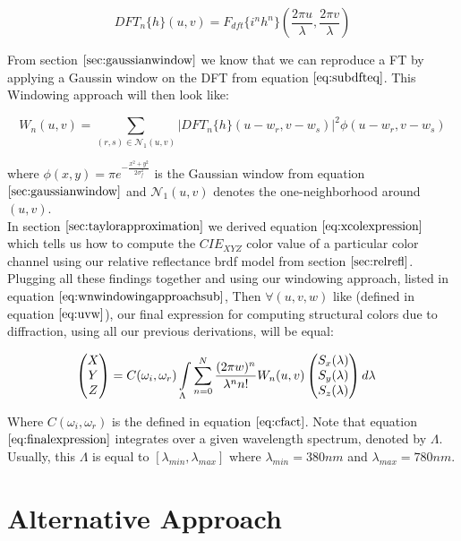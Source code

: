 \begin{equation}
DFT_{n}\{h\}(u,v) = {F}_{dft}\{i^n h^n\}(\frac{2\pi u}{\lambda},\frac{2\pi v}{\lambda})
\label{eq:subdfteq}
\end{equation}

From section $\ref{sec:gaussianwindow}$ we know that we can reproduce a FT by applying a Gaussin window on the DFT from equation $\ref{eq:subdfteq}$. This Windowing approach will then look like: 

\begin{equation}
  W_{n}(u,v) = \sum_{(r,s) \in \mathcal{N}_1(u,v)} \left| DFT_{n}\{h\}(u-w_r, v-w_s) \right|^2 \phi(u-w_r, v-w_s)
  \label{eq:wnwindowingapproachsub}
\end{equation}

where $\phi(x,y) = \pi e^{-\frac{x^2 + y^2}{2\sigma_{f}^2}}$ is the Gaussian window from equation $\ref{sec:gaussianwindow}$ and $\mathcal{N}_1(u,v)$ denotes the one-neighborhood around $(u,v)$. \\

In section $\ref{sec:taylorapproximation}$ we derived equation $\ref{eq:xcolexpression}$ which tells us how to compute the $CIE_{XYZ}$ color value of a particular color channel using our relative reflectance brdf model from section $\ref{sec:relrefl}$. Plugging all these findings together and using our windowing approach, listed in equation $\ref{eq:wnwindowingapproachsub}$, Then $\forall (u,v,w)$ like (defined in equation $\ref{eq:uvw}$), our final expression for computing structural colors due to diffraction, using all our previous derivations, will be equal:

\begin{equation}
\begin{split}
\colvec[X]{Y}{Z}& = C(\omega_i,\omega_r) \int \limits_{\Lambda} \sum_{n=0}^N  \frac{(2 \pi w)^n}{\lambda^n n!} W_{n}(u,v) \colvec[S_x(\lambda)]{S_y(\lambda)}{S_z(\lambda)}d\lambda
\end{split}
\label{eq:finalexpression}
\end{equation}

Where $C(\omega_i,\omega_r)$ is the defined in equation $\ref{eq:cfact}$. Note that equation $\ref{eq:finalexpression}$ integrates over a given wavelength spectrum, denoted by $\Lambda$. Usually, this $\Lambda$ is equal to $[\lambda_{min}, \lambda_{max}]$ where $\lambda_{min} = 380nm$ and $\lambda_{max}=780nm$. \\

\section{Alternative Approach}
